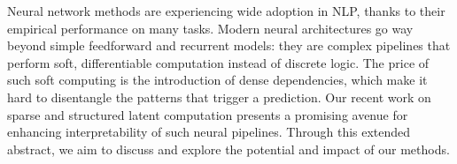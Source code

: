 Neural network methods are experiencing wide adoption in NLP, thanks to their empirical performance on many tasks. Modern neural architectures go way beyond simple feedforward and recurrent models: they are complex pipelines that perform soft, differentiable computation instead of discrete logic. The price of such soft computing is the introduction of dense dependencies, which make it hard to disentangle the patterns that trigger a prediction.  Our recent work on sparse and structured latent computation presents a promising avenue for enhancing interpretability of such neural pipelines. Through this extended abstract, we aim to discuss and explore the potential and impact of our methods.
